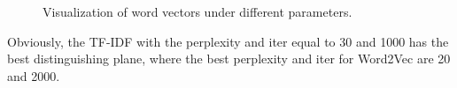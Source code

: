 \documentclass[12pt]{article}%
\begin{document}
\begin{figure}[H]
	
	\centering
	\caption{Visualization of word vectors under different parameters.}
	\label{fisg}
\end{figure}

Obviously, the TF-IDF with the perplexity and iter equal to 30 and 1000 has the best distinguishing plane, where the best perplexity and iter for Word2Vec are 20 and 2000. 
\end{document}

